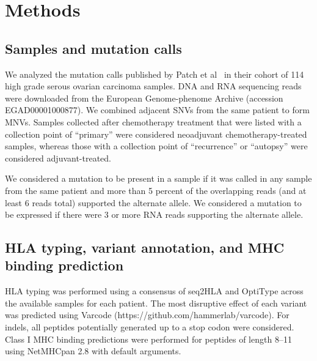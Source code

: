 \section*{Methods}

\subsection*{Samples and mutation calls}
We analyzed the mutation calls published by Patch et al~\cite{Patch_2015} in their cohort of 114 high grade serous ovarian carcinoma samples. DNA and RNA sequencing reads were downloaded from the European Genome-phenome Archive (accession EGAD00001000877). We combined adjacent SNVs from the same patient to form MNVs. Samples collected after chemotherapy treatment that were listed with a collection point of ``primary'' were considered neoadjuvant chemotherapy-treated samples, whereas those with a collection point of ``recurrence'' or ``autopsy'' were considered adjuvant-treated.


We considered a mutation to be present in a sample if it was called in any sample from the same patient and more than 5 percent of the overlapping reads (and at least 6 reads total) supported the alternate allele. We considered a mutation to be expressed if there were 3 or more RNA reads supporting the alternate allele.


\subsection*{HLA typing, variant annotation, and MHC binding prediction}
\begin{sloppypar}
HLA typing was performed using a consensus of seq2HLA\cite{Boegel_2012} and OptiType\cite{Szolek_2014} across the available samples for each patient. The most disruptive effect of each variant was predicted using Varcode (https://github.com/hammerlab/varcode). For indels, all peptides potentially generated up to a stop codon were considered. Class I MHC binding predictions were performed for peptides of length 8--11 using NetMHCpan 2.8\cite{Lundegaard_2008} with default arguments.
\end{sloppypar}

